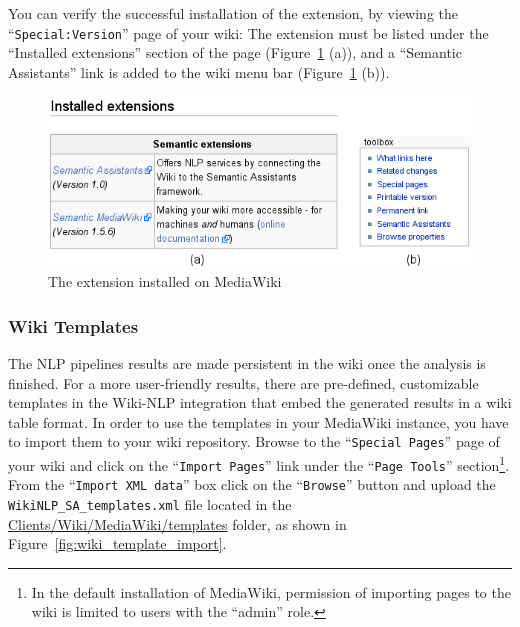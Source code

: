 You can verify the successful installation of the \sa extension, by viewing the ``\texttt{Special:Version}'' page of your wiki: The \sa extension must be listed under the ``Installed extensions'' section of the page (Figure~\ref{fig:semassist_plugin} (a)), and a ``Semantic Assistants'' link is added to the wiki menu bar (Figure~\ref{fig:semassist_plugin} (b)).

\begin{figure}
\centering
\includegraphics[scale=0.8]{pictures/semassist_plugin.png}
\caption{The \sa extension installed on MediaWiki}
\label{fig:semassist_plugin}
\end{figure}


\subsubsection{Wiki Templates}
The NLP pipelines results are made persistent in the wiki once the analysis is finished. For a more user-friendly results, there are pre-defined, customizable templates in the \sa Wiki-NLP integration that embed the generated results in a wiki table format. In order to use the templates in your MediaWiki instance, you have to import them to your wiki repository. Browse to the ``\texttt{Special Pages}'' page of your wiki and click on the ``\texttt{Import Pages}'' link under the ``\texttt{Page Tools}'' section\footnote{In the default installation of MediaWiki, permission of importing pages to the wiki is limited to users with the ``admin'' role.}. From the ``\texttt{Import XML data}'' box click on the ``\texttt{Browse}'' button and upload the \texttt{WikiNLP\_SA\_templates.xml} file located in the \url{Clients/Wiki/MediaWiki/templates} folder, as shown in Figure~\ref{fig:wiki_template_import}.

